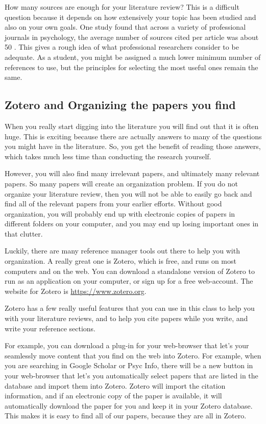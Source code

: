 How many sources are enough for your literature review? This is a difficult question because it depends on how extensively your topic has been studied and also on your own goals. One study found that across a variety of professional journals in psychology, the average number of sources cited per article was about 50 \citep{adair_explosion_2003}. This gives a rough idea of what professional researchers consider to be adequate. As a student, you might be assigned a much lower minimum number of references to use, but the principles for selecting the most useful ones remain the same.

\subsection{Zotero and Organizing the papers you find}

When you really start digging into the literature you will find out that it is often huge. This is exciting because there are actually answers to many of the questions you might have in the literature. So, you get the benefit of reading those answers, which takes much less time than conducting the research yourself. 

However, you will also find many irrelevant papers, and ultimately many relevant papers. So many papers will create an organization problem. If you do not organize your literature review, then you will not be able to easily go back and find all of the relevant papers from your earlier efforts. Without good organization, you will probably end up with electronic copies of papers in different folders on your computer, and you may end up losing important ones in that clutter.

Luckily, there are many reference manager tools out there to help you with organization. A really great one is Zotero, which is free, and runs on most computers and on the web. You can download a standalone version of Zotero to run as an application on your computer, or sign up for a free web-account. The website for Zotero is \url{https://www.zotero.org}.

Zotero has a few really useful features that you can use in this class to help you with your literature reviews, and to help you cite papers while you write, and write your reference sections.

For example, you can download a plug-in for your web-browser that let's your seamlessly move content that you find on the web into Zotero. For example, when you are searching in Google Scholar or Psyc Info, there will be a new button in your web-browser that let's you automatically select papers that are listed in the database and import them into Zotero. Zotero will import the citation information, and if an electronic copy of the paper is available, it will automatically download the paper for you and keep it in your Zotero database. This makes it is easy to find all of our papers, because they are all in Zotero.

